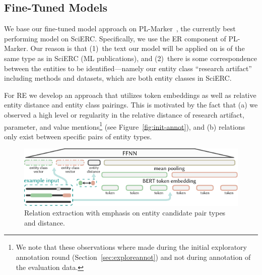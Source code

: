\subsection{Fine-Tuned Models}

%


We base our fine-tuned model approach on PL-Marker~\cite{Ye2022}, the currently best performing model on SciERC. Specifically, we use the ER component of PL-Marker. Our reason is that (1)~the text our model will be applied on is of the same type as in SciERC (ML publications), and (2)~there is some correspondence between the entities to be identified---namely our entity class ``research artifact'' including methods and datasets, which are both entity classes in SciERC.

For RE we develop an approach that utilizes token embeddings as well as relative entity distance and entity class pairings. This is motivated by the fact that (a) we observed a high level or regularity in the relative distance of research artifact, parameter, and value mentions\footnote{We note that these observations where made during the initial exploratory annotation round (Section~\ref{sec:exploreannot}) and not during annotation of the evaluation data.} (see Figure~\ref{fig:init-annot}), and (b) relations only exist between specific pairs of entity types.

\begin{figure}[bt]
  \centering
  \includegraphics[width=.8\linewidth]{figures/ref_params/ffnn_re_sub_visual_v2}
  \caption{Relation extraction with emphasis on entity candidate pair types and distance.}
  \label{fig:ffnn-re-sub-visual}
\end{figure}

